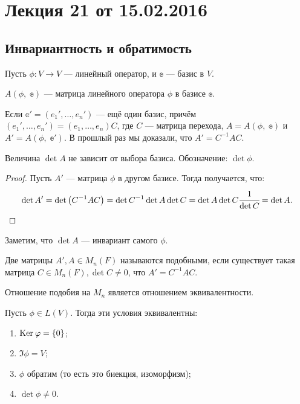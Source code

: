 



\section{Лекция 21 от 15.02.2016}

\subsection*{Инвариантность и обратимость}
Пусть $\phi\colon V \rightarrow V$ --- линейный оператор, и $\mathbb{e}$ --- базис в $V$. 

\begin{Designation}
    $A(\phi,\;\mathbb{e})$ --- матрица линейного оператора $\phi$ в базисе $\mathbb{e}$.
\end{Designation}

Если $\mathbb{e}' = (e_1', \ldots, e_n')$ --- ещё один базис, причём $(e_1', \ldots, e_n') = (e_1, \ldots, e_n)C$, где $C$ --- матрица перехода, $A = A(\phi,\; \mathbb{e})$ и  $A' = A(\phi,\; \mathbb{e}')$.
В прошлый раз мы доказали, что $A' = C^{-1}AC$.

\begin{Consequence}
    Величина $\det A$ не зависит от выбора базиса. Обозначение: $\det\phi$.
\end{Consequence}

\begin{proof}
    Пусть $A'$ --- матрица $\phi$ в другом базисе. Тогда получается, что:
    \begin{gather*}
        \det A' = \det \left(C^{-1}AC\right) = \det C^{-1} \det A \det C = \det A \det C \cfrac{1}{\det C} = \det A.
    \end{gather*}
\end{proof}

Заметим, что $\det A$ --- инвариант самого $\phi$. 

\begin{Def}
    Две матрицы $A', A \in M_n(F)$ называются подобными, если существует такая матрица $C \in M_n(F), \det C \neq 0$, что $A' = C^{-1}AC$.
\end{Def}

\begin{Comment}
    Отношение подобия на $M_n$ является отношением эквивалентности. 
\end{Comment}

\begin{Suggestion}
    Пусть $\phi \in L(V)$. Тогда эти условия эквивалентны:
    \begin{enumerate}
        \item $\mathrm{Ker}\:\varphi = \{0\}$;
        \item $\Im \phi = V$;
        \item $\phi$ обратим (то есть это биекция, изоморфизм);
        \item $\det \phi \neq 0$.
    \end{enumerate}
\end{Suggestion}

